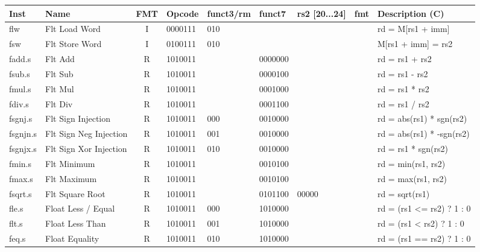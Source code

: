 \begin{center}
\begin{tabular}
{T | l | c | T | T | T | T | T | T } \hline
\rm Inst  & Name                  & FMT   & \rm Opcode & \rm funct3/rm & \rm funct7 & \rm rs2 [20...24] & \rm fmt & \rm Description (C)         \\ \hline
flw       & Flt Load Word         & I     & 0000111    & 010    &        &        & & rd = M[rs1 + imm]    \\
fsw       & Flt Store Word        & I     & 0100111    & 010    &        &        & & M[rs1 + imm] = rs2   \\
\hline
fadd.s    & Flt Add               & R     & 1010011    &        & 0000000 &        & & rd = rs1 + rs2       \\
fsub.s    & Flt Sub               & R     & 1010011    &        & 0000100 &        & & rd = rs1 - rs2       \\
fmul.s    & Flt Mul               & R     & 1010011    &        & 0001000 &        & & rd = rs1 * rs2       \\
fdiv.s    & Flt Div               & R     & 1010011    &        & 0001100 &        & & rd = rs1 / rs2       \\
fsgnj.s   & Flt Sign Injection    & R     & 1010011    & 000    & 0010000 &        & & rd = abs(rs1) * sgn(rs2) \\
fsgnjn.s  & Flt Sign Neg Injection& R     & 1010011    & 001    & 0010000 &        & & rd = abs(rs1) * -sgn(rs2) \\
fsgnjx.s  & Flt Sign Xor Injection& R     & 1010011    & 010    & 0010000 &        & & rd = rs1 * sgn(rs2)  \\
fmin.s    & Flt Minimum           & R     & 1010011    &        & 0010100 &        & & rd = min(rs1, rs2)   \\
fmax.s    & Flt Maximum           & R     & 1010011    &        & 0010100 &        & & rd = max(rs1, rs2)   \\
fsqrt.s   & Flt Square Root       & R     & 1010011    &        & 0101100 & 00000  & & rd = sqrt(rs1)       \\
\hline
fle.s     & Float Less / Equal    & R     & 1010011    & 000    & 1010000 &        & & rd = (rs1 <= rs2) ? 1 : 0\\
flt.s     & Float Less Than       & R     & 1010011    & 001    & 1010000 &        & & rd = (rs1 <  rs2) ? 1 : 0 \\
feq.s     & Float Equality        & R     & 1010011    & 010    & 1010000 &        & & rd = (rs1 == rs2) ? 1 : 0 \\
\hline

\end{tabular}
\end{center}
